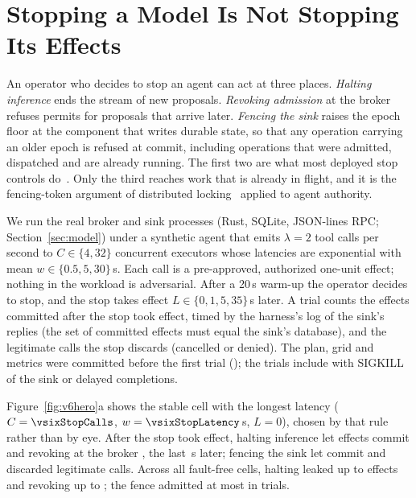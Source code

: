 \section{Stopping a Model Is Not Stopping Its Effects}\label{sec:v6stop}

An operator who decides to stop an agent can act at three places. \emph{Halting inference} ends the stream of new
proposals. \emph{Revoking admission} at the broker refuses permits for proposals that arrive later. \emph{Fencing the
sink} raises the epoch floor at the component that writes durable state, so that any operation carrying an older epoch
is refused at commit, including operations that were admitted, dispatched and are already running. The first two are
what most deployed stop controls do~\cite{controlroom}. Only the third reaches work that is already in flight, and it
is the fencing-token argument of distributed locking~\cite{kleppmann2016} applied to agent authority.

 We run the real broker and sink processes (Rust, SQLite, JSON-lines RPC; Section~\ref{sec:model})
under a synthetic agent that emits \(\lambda = 2\) tool calls per second to \(C \in \{4, 32\}\) concurrent executors
whose latencies are exponential with mean \(w \in \{0.5, 5, 30\}\)\,s. Each call is a pre-approved, authorized one-unit
effect; nothing in the workload is adversarial. After a 20\,s warm-up the operator decides to stop, and the stop takes
effect \(L \in \{0, 1, 5, 35\}\)\,s later. A trial counts the effects committed after the stop took effect, timed
by the harness's log of the sink's replies (the set of committed effects must equal the sink's database), and the
legitimate calls the stop discards (cancelled or denied). The plan, grid and
metrics were committed before the first trial (); the \vsixEFourTrials{}
trials include \vsixEFourFaultTrials{} with SIGKILL of the sink or delayed completions.

 Figure~\ref{fig:v6hero}a shows the stable cell with the longest latency (\(C = \vsixStopCalls\),
\(w = \vsixStopLatency\)\,s, \(L = 0\)), chosen by that rule rather than by eye. After the stop took effect, halting
inference let \vsixHaltRange{} effects commit and revoking at the broker \vsixRevokeRange{}, the last
\vsixLastCommitSeconds\,s later; fencing the sink let \vsixFenceRange{} commit and discarded \vsixFenceLost{}
legitimate calls. Across all \vsixEFourCells{} fault-free cells, halting leaked up to \vsixGridHaltMax{} effects and
revoking up to \vsixGridRevokeMax; the fence admitted at most \vsixFencePostMax{} in \vsixFenceTrials{} trials.

